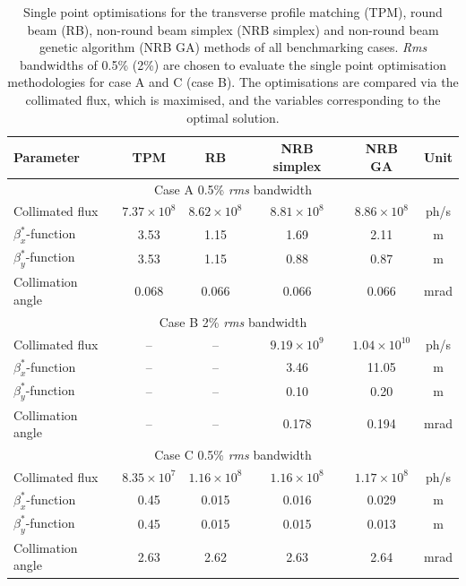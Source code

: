 \documentclass[../main.tex]{subfiles}
\begin{document}
\begin{table}[!h]
\centering
\caption{Single point optimisations for the transverse profile matching (TPM), round beam (RB), non-round beam simplex (NRB simplex) and non-round beam genetic algorithm (NRB GA) methods of all benchmarking cases. \textit{Rms} bandwidths of 0.5\% (2\%) are chosen to evaluate the single point optimisation methodologies for case A and C (case B). The optimisations are compared via the collimated flux, which is maximised, and the variables corresponding to the optimal solution.}
\vspace{3mm}
\begin{threeparttable}
\begin{tabular}{lccccc}
\hline\hline
Parameter & TPM & RB & NRB simplex & NRB GA & Unit \\
\hline
\multicolumn{6}{c}{Case A 0.5\% \textit{rms} bandwidth} \\
\hline
Collimated flux & $7.37\times 10^{8}$ & $8.62\times 10^{8}$ & $8.81\times 10^{8}$ & $8.86\times 10^{8}$ & ph/\si{\second} \\
$\beta_{x}^{*}$-function & 3.53 & 1.15 & 1.69 & 2.11 & \si{\meter}\\
$\beta_{y}^{*}$-function & 3.53 & 1.15 & 0.88 & 0.87 & \si{\meter}\\
Collimation angle & 0.068 & 0.066 & 0.066 & 0.066 & \si{\milli\radian}\\
\hline
\multicolumn{6}{c}{Case B 2\% \textit{rms} bandwidth} \\
\hline
Collimated flux & -- & -- & $9.19\times 10^{9}$ & $1.04\times 10^{10}$ & ph/\si{\second} \\
$\beta_{x}^{*}$-function & -- & -- & 3.46 & 11.05 & \si{\meter} \\
$\beta_{y}^{*}$-function & -- & -- & 0.10 & 0.20 & \si{\meter} \\
Collimation angle & -- & -- & 0.178 & 0.194 & \si{\milli\radian} \\ 
\hline
\multicolumn{6}{c}{Case C 0.5\% \textit{rms} bandwidth} \\
\hline
Collimated flux & $8.35\times 10^{7}$ & $1.16\times 10^{8}$ & $1.16\times 10^{8}$ & $1.17\times 10^{8}$ & ph/\si{\second} \\
$\beta_{x}^{*}$-function & 0.45 & 0.015 & 0.016 & 0.029 & \si{\meter} \\
$\beta_{y}^{*}$-function & 0.45 & 0.015 & 0.015 & 0.013 & \si{\meter} \\
Collimation angle & 2.63 & 2.62 & 2.63 & 2.64 & \si{\milli\radian}\\

\end{tabular}
\end{threeparttable}
\end{table}
\end{document}
